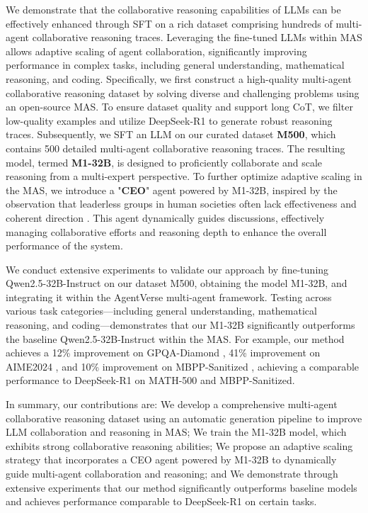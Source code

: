 We demonstrate that the collaborative reasoning capabilities of LLMs can be effectively enhanced through SFT on a rich dataset comprising hundreds of multi-agent collaborative reasoning traces. Leveraging the fine-tuned LLMs within MAS allows adaptive scaling of agent collaboration, significantly improving performance in complex tasks, including general understanding, mathematical reasoning, and coding. Specifically,  we first construct a high-quality multi-agent collaborative reasoning dataset by solving diverse and challenging problems using an open-source MAS. To ensure dataset quality and support long CoT, we filter low-quality examples and utilize DeepSeek-R1 \citep{r1} to generate robust reasoning traces. Subsequently, we SFT an LLM on our curated dataset \textbf{M500}, which contains 500 detailed multi-agent collaborative reasoning traces. The resulting model, termed \textbf{M1-32B}, is designed to proficiently collaborate and scale reasoning from a multi-expert perspective.  To further optimize adaptive scaling in the MAS, we introduce a "\textbf{CEO}" agent powered by M1-32B, inspired by the observation that leaderless groups in human societies often lack effectiveness and coherent direction \citep{cruz1999impact,hackman2002leading}. This agent dynamically guides discussions, effectively managing collaborative efforts and reasoning depth to enhance the overall performance of the system.

We conduct extensive experiments to validate our approach by fine-tuning Qwen2.5-32B-Instruct \citep{qwen25} on our dataset M500, obtaining the model M1-32B, and integrating it within the AgentVerse \citep{agentverse} multi-agent framework. Testing across various task categories—including general understanding, mathematical reasoning, and coding—demonstrates that our M1-32B significantly outperforms the baseline Qwen2.5-32B-Instruct within the MAS. For example, our method achieves a 12\% improvement on GPQA-Diamond \citep{gpqa}, 41\% improvement on AIME2024 \citep{aime2024}, and 10\% improvement on MBPP-Sanitized \citep{mbpp}, achieving a comparable performance to DeepSeek-R1 on MATH-500 and MBPP-Sanitized.

In summary, our contributions are:  We develop a comprehensive multi-agent collaborative reasoning dataset using an automatic generation pipeline to improve LLM collaboration and reasoning in MAS;  We train the M1-32B model, which exhibits strong collaborative reasoning abilities;  We propose an adaptive scaling strategy that incorporates a CEO agent powered by M1-32B to dynamically guide multi-agent collaboration and reasoning; and  We demonstrate through extensive experiments that our method significantly outperforms baseline models and achieves performance comparable to DeepSeek-R1 on certain tasks.